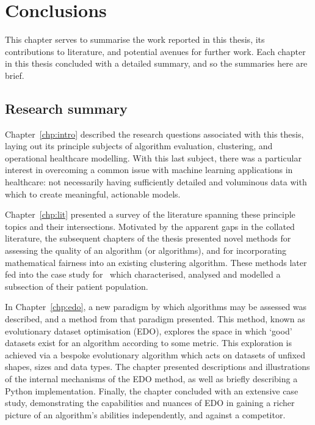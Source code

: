 \chapter{Conclusions}\label{chp:conc}

This chapter serves to summarise the work reported in this thesis, its
contributions to literature, and potential avenues for further work. Each
chapter in this thesis concluded with a detailed summary, and so the summaries
here are brief.

\section{Research summary}

Chapter~\ref{chp:intro} described the research questions associated with this
thesis, laying out its principle subjects of algorithm evaluation, clustering,
and operational healthcare modelling. With this last subject, there was a
particular interest in overcoming a common issue with machine learning
applications in healthcare: not necessarily having sufficiently detailed and
voluminous data with which to create meaningful, actionable models.

Chapter~\ref{chp:lit} presented a survey of the literature spanning these
principle topics and their intersections. Motivated by the apparent gaps in the
collated literature, the subsequent chapters of the thesis presented novel
methods for assessing the quality of an algorithm (or algorithms), and for
incorporating mathematical fairness into an existing clustering algorithm. These
methods later fed into the case study for \ctmuhb\ which characterised, analysed
and modelled a subsection of their patient population.

In Chapter~\ref{chp:edo}, a new paradigm by which algorithms may be assessed was
described, and a method from that paradigm presented. This method, known as
evolutionary dataset optimisation (EDO), explores the space in which `good'
datasets exist for an algorithm according to some metric. This exploration is
achieved via a bespoke evolutionary algorithm which acts on datasets of unfixed
shapes, sizes and data types. The chapter presented descriptions and
illustrations of the internal mechanisms of the EDO method, as well as briefly
describing a Python implementation. Finally, the chapter concluded with an
extensive case study, demonstrating the capabilities and nuances of EDO in
gaining a richer picture of an algorithm's abilities independently, and against
a competitor.

